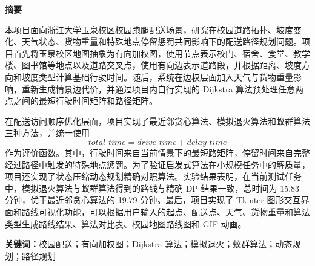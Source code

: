 \documentclass[12pt,a4paper,UTF8]{article}
\begin{document}



\newpage
\pagestyle{fancy}
\fancyhf{}
\chead{}
\renewcommand{\headrulewidth}{0.4pt}
\cfoot{} %

\vspace*{1em}

\begin{center}
    {\Large\bfseries 摘\quad 要}
\end{center}

\vspace{0.5em}

\setlength{\parindent}{2em}

本项目面向浙江大学玉泉校区校园跑腿配送场景，研究在校园道路拓扑、坡度变化、天气状态、货物重量和特殊地点停留惩罚共同影响下的配送路径规划问题。项目首先将玉泉校区地图抽象为有向加权图，使用节点表示校门、宿舍、食堂、教学楼、图书馆等地点以及道路交叉点，使用有向边表示道路段，并根据距离、坡度方向和坡度类型计算基础行驶时间。随后，系统在边权层面加入天气与货物重量影响，重新生成情景边代价，并通过项目内自行实现的 Dijkstra 算法预处理任意两点之间的最短行驶时间矩阵和路径矩阵。

在配送访问顺序优化层面，项目实现了最近邻贪心算法、模拟退火算法和蚁群算法三种方法，并统一使用\[total\_time = drive\_time + delay\_time\]
作为评价函数。其中，行驶时间来自当前情景下的最短路矩阵，停留时间来自完整经过路径中触发的特殊地点惩罚。为了验证启发式算法在小规模任务中的解质量，项目还实现了状态压缩动态规划精确对照算法。实验结果表明，在当前测试任务中，模拟退火算法与蚁群算法得到的路线与精确 DP 结果一致，总时间为 15.83 分钟，优于最近邻贪心算法的 19.79 分钟。最后，项目实现了 Tkinter 图形交互界面和路线可视化功能，可以根据用户输入的起点、配送点、天气、货物重量和算法类型生成路线结果、算法对比表、校园地图路线图和 GIF 动画。

\vspace{0.8em}
\noindent
\textbf{关键词：}校园配送；有向加权图；Dijkstra 算法；模拟退火；蚁群算法；动态规划；路径规划


\newpage

\pagestyle{empty}
\thispagestyle{empty}
\maketoc    %

\pagestyle{fancy}
\fancyhf{}
\lhead{}
\chead{}
\renewcommand{\headrulewidth}{0.4pt}
\cfoot{\thepage}
\end{document}

